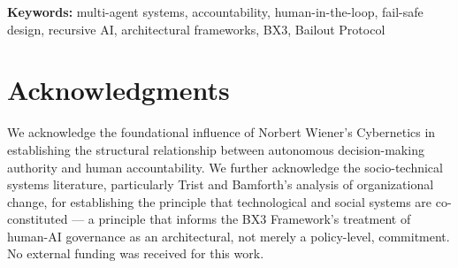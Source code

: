 \documentclass[11pt,oneside]{article}
\begin{document}
\noindent\textbf{Keywords:} multi-agent systems, accountability, human-in-the-loop,
fail-safe design, recursive AI, architectural frameworks, BX3, Bailout Protocol

\newpage









\section*{Acknowledgments}
We acknowledge the foundational influence of Norbert Wiener's Cybernetics in
establishing the structural relationship between autonomous decision-making
authority and human accountability.  We further acknowledge the socio-technical
systems literature, particularly Trist and Bamforth's analysis of organizational
change, for establishing the principle that technological and social systems are
co-constituted --- a principle that informs the BX3 Framework's treatment of
human-AI governance as an architectural, not merely a policy-level, commitment.
No external funding was received for this work.



\end{document}
